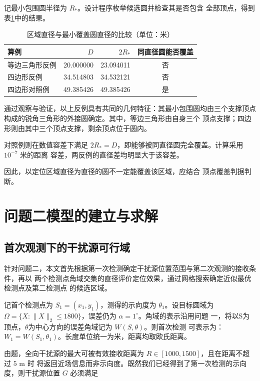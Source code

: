 \documentclass[withoutpreface,bwprint]{cumcmthesis} %
\begin{document}
记最小包围圆半径为 $R_*$。设计程序枚举候选圆并检查其是否包含
全部顶点，得到表\ref{tab:coverage-check}中的结果。

\begin{table}[htbp]
    \centering
    \caption{区域直径与最小覆盖圆直径的比较（单位：米）}
    \label{tab:coverage-check}
    \begin{tabular}{lrrc}
        \toprule
        算例 & $D$ & $2R_*$ & 同直径圆能否覆盖 \\
        \midrule
        等边三角形反例 & 20.000000 & 23.094011 & 否 \\
        四边形反例     & 34.514803 & 34.532121 & 否 \\
        四边形对照例   & 49.385426 & 49.385426 & 是 \\
        \bottomrule
    \end{tabular}
\end{table}

通过观察与验证，以上反例具有共同的几何特征：其最小包围圆均由三个支撑顶点
构成的锐角三角形的外接圆确定。其中，等边三角形由自身三个
顶点支撑；四边形则由其中三个顶点支撑，剩余顶点位于圆内。

对照例则在数值容差下满足
$2R_*=D$，即能够被同直径圆完全覆盖。计算采用 $10^{-7}$ 米的距离
容差，两反例的直径差均明显大于该容差。

因此，以定位区域直径为直径的圆不一定能覆盖该区域，应结合
顶点覆盖判据判断。

\section{问题二模型的建立与求解}

\subsection{首次观测下的干扰源可行域}

针对问题二，本文首先根据第一次检测确定干扰源位置范围与第二次观测的接收条件，再以
两个检测点角域交集的直径评价定位效果，通过网格搜索确定近似最优检测点及第二检测点
的候选区域。

记首个检测点为 $S_1=(x_1,y_1)$，测得的示向度为 $\theta_1$。设目标圆域为 
$\Omega=\{X:\|X\|_2\le1800\}$，误差仍为 $\alpha=1^\circ$。角域的表示沿用问题
一，将以S为顶点，$\theta$为中心方向的误差角域记为 $W(S,\theta)$。则首次检测
可表示为：$W_1=W(S_1,\theta_1)$。长度单位统一为米，距离均取欧氏距离。

由题，全向干扰源的最大可被有效接收距离为 $R\in[1000,1500]$，且在距离不超过 $5$ m 时
将返回近场信息而非示向度。既然我们已经得到了第一次检测的示向度，则干扰源位置 $G$ 必须满足
\end{document}
